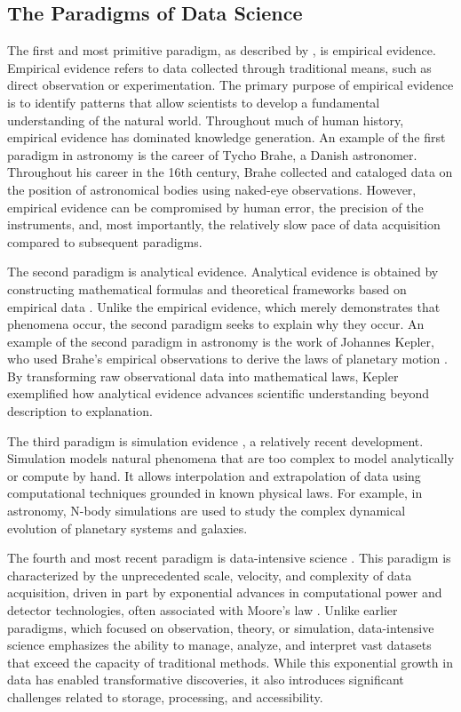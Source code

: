 \documentclass[preprint,linenumbers, longauthor]{aastex631}
\begin{document}
\subsection{The Paradigms of Data Science}
The first and most primitive paradigm, as described by \cite{heyFourthParadigmDataIntensive2009}, is empirical evidence. 
Empirical evidence refers to data collected through traditional means, such as direct observation or experimentation. 
The primary purpose of empirical evidence is to identify patterns that allow scientists to develop a fundamental understanding of the natural world. 
Throughout much of human history, empirical evidence has dominated knowledge generation. 
An example of the first paradigm in astronomy is the career of Tycho Brahe, a Danish astronomer. Throughout his career in the 16th century, Brahe collected and cataloged data on the position of astronomical bodies using naked-eye observations. 
However, empirical evidence can be compromised by human error, the precision of the instruments, and, most importantly, the relatively slow pace of data acquisition compared to subsequent paradigms.

The second paradigm is analytical evidence. Analytical evidence is obtained by constructing mathematical formulas and theoretical frameworks based on empirical data \cite{heyFourthParadigmDataIntensive2009}. 
Unlike the empirical evidence, which merely demonstrates that phenomena occur, the second paradigm seeks to explain why they occur. 
An example of the second paradigm in astronomy is the work of Johannes Kepler, who used Brahe's empirical observations to derive the laws of planetary motion \citep{heyFourthParadigmDataIntensive2009}. 
By transforming raw observational data into mathematical laws, Kepler exemplified how analytical evidence advances scientific understanding beyond description to explanation.

The third paradigm is simulation evidence \cite{heyFourthParadigmDataIntensive2009}, a relatively recent development. Simulation models natural phenomena that are too complex to model analytically or compute by hand. 
It allows interpolation and extrapolation of data using computational techniques grounded in known physical laws. 
For example, in astronomy, N-body simulations are used to study the complex dynamical evolution of planetary systems and galaxies. 

The fourth and most recent paradigm is data-intensive science \cite{heyFourthParadigmDataIntensive2009}. 
This paradigm is characterized by the unprecedented scale, velocity, and complexity of data acquisition, driven in part by exponential advances in computational power and detector technologies, often associated with Moore's law \cite{heyFourthParadigmDataIntensive2009}. 
Unlike earlier paradigms, which focused on observation, theory, or simulation, data-intensive science emphasizes the ability to manage, analyze, and interpret vast datasets that exceed the capacity of traditional methods. 
While this exponential growth in data has enabled transformative discoveries, it also introduces significant challenges related to storage, processing, and accessibility. 
\end{document}
